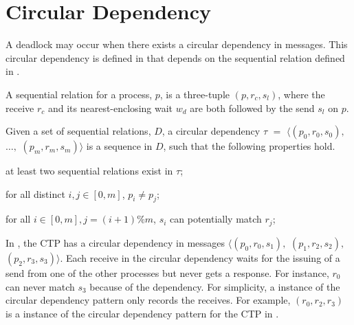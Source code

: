 \section{Circular Dependency}

\examplefigfour

A deadlock may occur when there exists a circular dependency in messages. This circular dependency is defined in  that depends on the sequential relation defined in . 

\begin{definition}
A sequential relation for a process, $p$, is a three-tuple $(p, \mathit{r_c}, \mathit{s_l})$, where the receive $\mathit{r_c}$ and its nearest-enclosing wait $\mathit{w_d}$ are both followed by the send $\mathit{s_l}$ on $p$. 
\label{def:seqrelation}
\end{definition}

\begin{definition}
Given a set of sequential relations, $D$, a circular dependency $\tau$ $=$ $\langle(p_0, \mathit{r}_0, \mathit{s}_0),$ $\ldots,$ $(p_m, \mathit{r}_m, \mathit{s}_m)\rangle$ is a sequence in $D$, such that the following properties hold.
\begin{compactenum}
\item at least two sequential relations exist in $\tau$;
\item for all distinct $i,j \in [0,m]$, $p_i \neq p_j$;
\item for all $i \in [0,m], j = (i+1) \% m$, $\mathit{s}_i$ can potentially match $\mathit{r}_j$;
\end{compactenum}
\label{def:circular}
\end{definition}

In , the CTP has a circular dependency in messages $\langle(p_0, \mathit{r_{0}}, \mathit{s_{1}}),$ $(p_1, \mathit{r_{2}}, \mathit{s_{2}}),$ $(p_2, \mathit{r_{3}}, \mathit{s_{3}})\rangle$. Each receive in the circular dependency waits for the issuing of a send from one of the other processes but never gets a response. For instance, $\mathit{r_{0}}$ can never match $\mathit{s_{3}}$ because of the dependency. For simplicity, a instance of the circular dependency pattern only records the receives. For example, $(\mathit{r_{0}}, \mathit{r_{2}}, \mathit{r_{3}})$ is a instance of the circular dependency pattern for the CTP in . 

